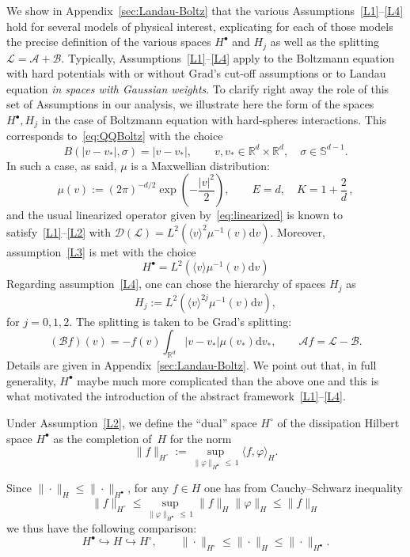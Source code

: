 \documentclass[AHL,Unicode,longabstracts,published]{cedram}
\renewcommand{\d}{\mathrm{d}}
\newcommand{\R}{\mathbb{R}}
\renewcommand{\S}{\mathbb{S}}
\renewcommand{\AA}{\mathcal{A}}
\newcommand{\BB}{\mathcal{B}}
\newcommand{\LL}{\mathcal{L}}
\newcommand{\dom}{\mathscr{D}}
\newcommand{\Ss}{H}
\newcommand{\Ssp}{H^{\bullet}}
\newcommand{\Ssm}{H^{\circ}}
\renewcommand*\le{\leqslant}
\renewcommand*\leq{\leqslant}
\newcommand{\la}{\langle}
\newcommand{\ra}{\rangle}
\begin{document}
\begin{exem}\label{rem:L1B1}
We show in Appendix~\ref{sec:Landau-Boltz} that the various Assumptions~\eqref{L1}--\eqref{L4} hold for several models of physical interest, explicating for each of those models the precise definition of the various spaces $\Ssp$ and $\Ss_{j}$ as well as the splitting $\LL=\AA+\BB$. {Typically, Assumptions~\eqref{L1}--\eqref{L4} apply to the Boltzmann equation with hard potentials with or without Grad's cut-off assumptions or to Landau equation \emph{in spaces with Gaussian weights}.} To clarify right away the role of this set of Assumptions in our analysis, we illustrate here the form of the spaces $\Ssp,\Ss_{j}$ in the case of Boltzmann equation with hard-spheres interactions. This corresponds to~\eqref{eq:QQBoltz} with the choice
\[
B(|v-v_{*}|,\sigma)=|v-v_{*}|, \qquad v,v_{*} \in \R^{d}\times\R^{d}, \quad \sigma \in \S^{d-1}.
\]
In such a case, as said, $\mu$ is a Maxwellian distribution:
\begin{equation}\label{eq:muMax}
\mu(v) := (2 \pi)^{-d/2} \exp\left(- \frac{|v|^2}{2} \right), \qquad E = d, \quad K = 1 + \frac{2}{d} \,,
\end{equation}
and the usual linearized operator given by~\eqref{eq:linearized} is known to satisfy~\eqref{L1}--\eqref{L2} with $\dom(\LL)=L^2(\langle v\rangle^2\mu^{-1}(v)\d v)$. Moreover, assumption~\eqref{L3} is met with the choice
\[
\Ssp=L^2\left(\la v\ra \mu^{-1}(v)\d v\right)
\]
Regarding assumption~\eqref{L4}, one can chose the hierarchy of spaces $\Ss_{j}$ as
\[
\Ss_j := L^2\left(\la v \ra^{2 j} \mu^{-1}(v) \d v \right),
\]
for $j=0,1,2$. The splitting is taken to be Grad's splitting:
\[
(\BB f)(v) = - f(v) \int_{\R^d} |v-v_*| \mu(v_*) \d v_*, \qquad \AA f = \LL - \BB.
\]
Details are given in Appendix~\ref{sec:Landau-Boltz}. We point out that, in full generality, $\Ssp$ maybe much more complicated than the above one and this is what motivated the introduction of the abstract framework~\eqref{L1}--\eqref{L4}.
\end{exem}

\begin{defi}\label{defi:Hhstar}
Under Assumption~\eqref{L2}, we define the ``dual'' space $\Ssm$ of the dissipation Hilbert space $\Ssp$ as the completion of~$\Ss$ for the norm
\[
\| f \|_{\Ssm} := \sup_{ \| \varphi \|_{\Ssp}\,\le\,1} \la f, \varphi \ra_{\Ss}.
\]
\end{defi}

\begin{rema}\label{rem:rangHh}
Since $\|\cdot\|_{\Ss} \leq \|\cdot\|_{\Ssp}$, for any $f \in\Ss$ one has from Cauchy--Schwarz inequality
\[
\|f\|_{\Ssm} \le \sup_{\|\varphi\|_{\Ssp}\,\leq\,1} \|f\|_{\Ss}\|\varphi\|_{\Ss} \le \|f\|_{\Ss}
\]
we thus have the following comparison:
\[
\Ssp \hookrightarrow \Ss \hookrightarrow \Ssm, \qquad \|\cdot\|_{\Ssm} \leq \|\cdot\|_{\Ss} \leq \|\cdot\|_{\Ssp}.
\]
\end{rema}
\end{document}

